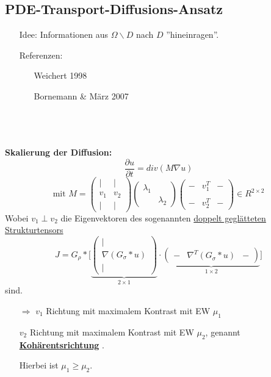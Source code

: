 \documentclass[ngerman]{article}
\theoremstyle{plain}
\theoremstyle{definition}
\numberwithin{equation}{section}
\newcommand{\srmatrix}[1] {
\left( \begin{smallmatrix} #1 \end{smallmatrix} \right)
}
\newcommand{\mim}[1] {
\underline{\textbf{#1\index{#1}}}
}
\newcommand{\mat}[1] {
\begin{pmatrix} #1 \end{pmatrix}
}
\begin{document}
  \subsection{PDE-Transport-Diffusions-Ansatz}
    \begin{minipage}[c]{0.25\linewidth}
      \begin{center}
      \end{center}
    \end{minipage}
    \hfill
    \begin{minipage}[c]{0.65\linewidth}
        \begin{enumerate}
          \item[Idee:] Informationen aus $\Omega \backslash D$ nach $D$ ''hineinragen''.
          \item[Referenzen:] \begin{enumerate}
            \item[\textbullet] Weichert 1998
            \item[\textbullet] Bornemann \& März 2007
          \end{enumerate}
        \end{enumerate}
    \end{minipage}
    \ \\
    \ \\
    \hfill\\
    \textbf{Skalierung der Diffusion:}
    \[\frac{\partial u}{\partial t} = div(M \nabla u)\]
    \[\text{mit } M = \srmatrix{ | & |\\ v_1 & v_2\\ | & |} \mat{\lambda_1 & \ \\ & \lambda_2} \srmatrix{- & v_1^T & -\\ \\- & v_2^T & -} \in R^{2 \times 2}\]
    Wobei $v_1 \perp v_2$ die Eigenvektoren des sogenannten \underline{doppelt geglätteten Strukturtensors} 
    \[J= G_\rho * \biggl[ \underbrace{\srmatrix{| \\ \nabla (G_\sigma * u)\\ |}}_{2 \times 1} \cdot \underbrace{\srmatrix{- & \nabla^T(G_\sigma * u) & -}}_{1 \times 2} \biggr] \]
    sind.\\
    \begin{enumerate}
      \item[$\Rightarrow$] $v_1$ Richtung mit maximalem Kontrast mit EW $\mu_1$
      \item[] $v_2$ Richtung mit maximalem Kontrast mit EW $\mu_2$, genannt \mim{Kohärentsrichtung}.
      \item[] Hierbei ist $\mu_1 \geq \mu_2$.
    \end{enumerate}
\end{document}
